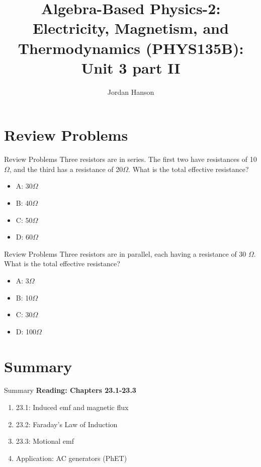 \documentclass{beamer}
\title{Algebra-Based Physics-2: Electricity, Magnetism, and Thermodynamics (PHYS135B): Unit 3 part II}
\author{Jordan Hanson}
\institute{Whittier College Department of Physics and Astronomy}
\begin{document}
\maketitle

\section{Review Problems}

\begin{frame}{Review Problems}
Three resistors are in series.  The first two have resistances of 10 $\Omega$, and the third has a resistance of 20$\Omega$.  What is the total effective resistance?
\begin{itemize}
\item A: 30$\Omega$
\item B: 40$\Omega$
\item C: 50$\Omega$
\item D: 60$\Omega$
\end{itemize}
\end{frame}

\begin{frame}{Review Problems}
Three resistors are in parallel, each having a resistance of 30 $\Omega$.  What is the total effective resistance?
\begin{itemize}
\item A: 3$\Omega$
\item B: 10$\Omega$
\item C: 30$\Omega$
\item D: 100$\Omega$
\end{itemize}
\end{frame}


\section{Summary}

\begin{frame}{Summary}
\textbf{Reading: Chapters 23.1-23.3} \\ \vspace{0.5cm}
\begin{enumerate}
\item 23.1: Induced emf and magnetic flux
\item 23.2: Faraday's Law of Induction
\item 23.3: Motional emf
\item Application: AC generators (PhET)
\end{enumerate}
\end{frame}
\end{document}
